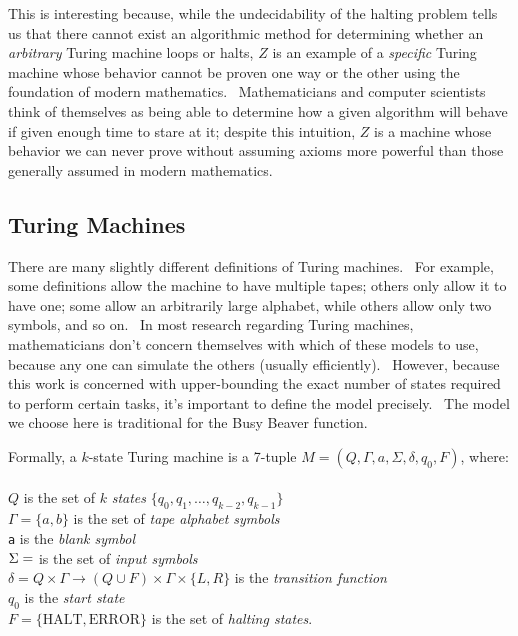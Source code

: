 \documentclass[11pt]{article}
\begin{document}
This is interesting because, while the undecidability of the halting problem tells us that there cannot exist an algorithmic method for determining whether an \emph{arbitrary} Turing machine loops or halts, $Z$ is an example of a \emph{specific} Turing machine whose behavior cannot be proven one way or the other using the foundation of modern mathematics. \ Mathematicians and computer scientists think of themselves as being able to determine how a given algorithm will behave if given enough time to stare at it; despite this intuition, $Z$ is a machine whose behavior we can never prove without assuming axioms more powerful than those generally assumed in modern mathematics.

\subsection{Turing Machines \label{sec:tm}}

There are many slightly different definitions of Turing machines. \ For example, some definitions allow the machine to have multiple tapes; others only allow it to have one; some allow an arbitrarily large alphabet, while others allow only two symbols, and so on. \ In most research regarding Turing machines, mathematicians don't concern themselves with which of these models to use, because any one can simulate the others (usually efficiently). \ However, because this work is concerned with upper-bounding the exact number of states required to perform certain tasks, it's important to define the model precisely. \ The model we choose here is traditional for the Busy Beaver function.

Formally, a $k$-state Turing machine is a 7-tuple $M = (Q, \Gamma, a, \Sigma, \delta, q_0, F)$, where: \\ \\
$Q$ is the set of $k$ \emph{states} $\{q_0, q_1, \dots, q_{k-2}, q_{k-1}\}$ \\
$\Gamma = \{a, b\}$ is the set of \emph{tape alphabet symbols} \\
\texttt{a} is the \emph{blank symbol} \\
$\Sigma = \empty$ is the set of \emph{input symbols} \\
$\delta = Q \times \Gamma \rightarrow (Q \cup F) \times \Gamma \times \{L, R\}$ is the \emph{transition function} \\
$q_0$ is the \emph{start state} \\
$F = \{\textrm{HALT}, \textrm{ERROR}\}$ is the set of \emph{halting states}. \\
\end{document}
